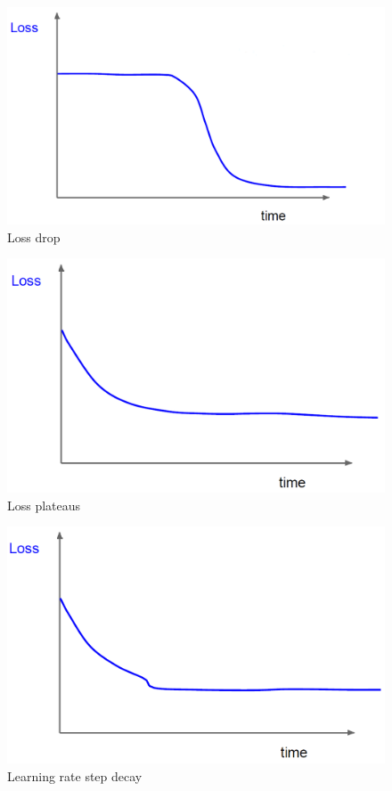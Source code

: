 \begin{minipage}{.3\linewidth}
    \begin{figure}[H]
        \centering
        \includegraphics[width=0.9\linewidth]{images/tnn-loss-1}
        \caption[Loss drop]{Loss drop}
        \label{fig:tnn-loss-1}
    \end{figure}
\end{minipage}
\begin{minipage}{.3\linewidth}
    \begin{figure}[H]
        \centering
        \includegraphics[width=0.9\linewidth]{images/tnn-loss-2}
        \caption[Loss plateaus]{Loss plateaus}
        \label{fig:tnn-loss-2}
    \end{figure}
\end{minipage}
\begin{minipage}{.3\linewidth}
    \begin{figure}[H]
        \centering
        \includegraphics[width=0.9\linewidth]{images/tnn-loss-3}
        \caption[Learning rate step decay]{Learning rate step decay}
        \label{fig:tnn-loss-3}
    \end{figure}
\end{minipage}

